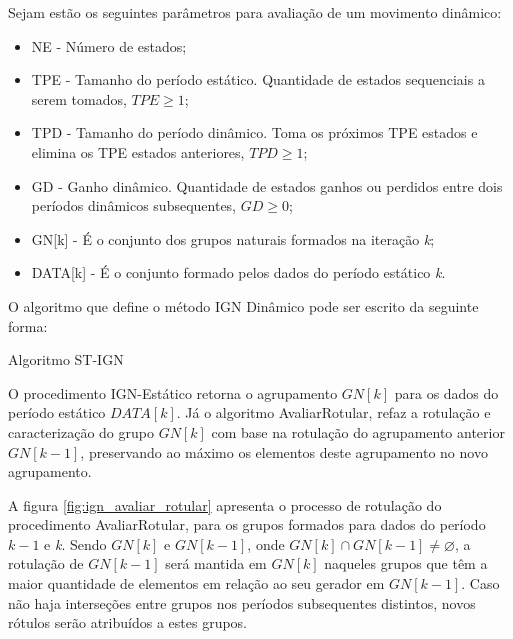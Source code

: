 Sejam estão os seguintes parâmetros para avaliação de um movimento dinâmico:
\begin{itemize}
    \item NE - Número de estados;
    \item TPE - Tamanho do período estático. Quantidade de estados sequenciais a serem tomados, ${TPE \geqslant 1}$;
    \item TPD - Tamanho do período dinâmico. Toma os próximos TPE estados e elimina os TPE estados anteriores, ${TPD \geqslant 1}$;
    \item GD - Ganho dinâmico. Quantidade de estados ganhos ou perdidos entre dois períodos dinâmicos subsequentes, ${GD \geqslant 0}$;
    \item GN[k] - É o conjunto dos grupos naturais formados na iteração \textit{k};
    \item DATA[k] - É o conjunto formado pelos dados do período estático \textit{k}.
\end{itemize}

O algoritmo que define o método IGN Dinâmico pode ser escrito da seguinte forma:

\begin{algorithm}[!ht]
	\SetSpacedAlgorithm
	\caption{\label{alg:algoritmo_stign}Algoritmo ST-IGN}
	\Inicio{
	    i = TPE\;
	    k = 1\;
	    s = 0\;
	    \Enqto{${s \geqslant NE}$}{
    	    \Se {${s = 0}$} {
	            ${t_1 = 1}$\;
    	    }
    	    \Senao {
    	        ${t_1 = t_1 + TPD}$\;
    	    }
    	    ${t_2 = t_1 + TPE + GD - 1}$\;
    	    ${DATA[k] = \{ I_s, s = t_1, ..., t_2 \} }$\;
    	    IGN-Estatico(${DATA[k], GN[k]}$)\;
    	    AvaliarRotular(${GN[k]}$, ${GN[[k-1]}$)\;
    	    ${k = k + 1}$\;
	    }
	}
\end{algorithm}

O procedimento IGN-Estático retorna o agrupamento ${GN[k]}$ para os dados do período estático ${DATA[k]}$. Já o algoritmo AvaliarRotular, refaz a rotulação e caracterização do grupo ${GN[k]}$ com base na rotulação do agrupamento anterior ${GN[k - 1]}$, preservando ao máximo os elementos deste agrupamento no novo agrupamento.

A figura \ref{fig:ign_avaliar_rotular} apresenta o processo de rotulação do procedimento AvaliarRotular, para os grupos formados para dados do período ${k - 1}$ e \textit{k}. Sendo ${GN[k]}$ e ${GN[k - 1]}$, onde ${GN[k] \cap GN[k - 1] \neq \varnothing 
}$, a rotulação de ${GN[k - 1]}$ será mantida em ${GN[k]}$ naqueles grupos que têm a maior quantidade de elementos em relação ao seu gerador em ${GN[k - 1]}$. Caso não haja interseções entre grupos nos períodos subsequentes distintos, novos rótulos serão atribuídos a estes grupos.


